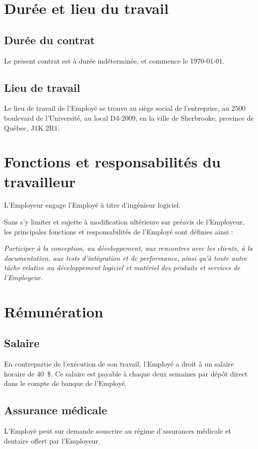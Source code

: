 \documentclass{article}
\begin{document}
    \section{Durée et lieu du travail}

        \subsection{Durée du contrat}
	    Le présent contrat est à durée indéterminée, et commence le \today.
        	
    	\subsection{Lieu de travail}
    	Le lieu de travail de l'Employé se trouve au siège social de l'entreprise, au 2500 boulevard de l'Université, au local D4-2009, en la ville de Sherbrooke, province de Québec, J1K 2R1.
    	
   \section{Fonctions et responsabilités du travailleur}
   	L'Employeur engage l'Employé à titre d'ingénieur logiciel.

    Sans s'y limiter et sujette à modification ultérieure sur préavis de l'Employeur, les principales fonctions et responsabilités de l'Employé sont définies ainsi :
    	
    	\emph{Participer à la conception, au développement, aux rencontres avec les clients, à la documentation, aux tests d'intégration et de performance, ainsi qu'à toute autre tâche relative au développement logiciel et matériel des produits et services de l'Employeur.}
    
    \section{Rémunération}
    	\subsection{Salaire}
    	En contrepartie de l'exécution de son travail, l'Employé a droit à un salaire horaire de \SI{40}{\$}. Ce salaire est payable à chaque deux semaines par dépôt direct dans le compte de banque de l'Employé.
    	
    	\subsection{Assurance médicale}
    	L'Employé peut sur demande souscrire au régime d'assurances médicale et dentaire offert par l'Employeur.
    	
\end{document}
